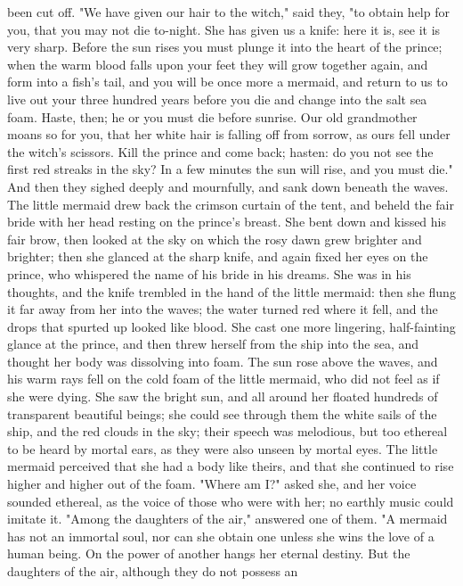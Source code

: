 been cut off.
    "We have given our hair to the witch," said they, "to obtain
help for you, that you may not die to-night. She has given us a knife:
here it is, see it is very sharp. Before the sun rises you must plunge
it into the heart of the prince; when the warm blood falls upon your
feet they will grow together again, and form into a fish's tail, and
you will be once more a mermaid, and return to us to live out your
three hundred years before you die and change into the salt sea
foam. Haste, then; he or you must die before sunrise. Our old
grandmother moans so for you, that her white hair is falling off
from sorrow, as ours fell under the witch's scissors. Kill the
prince and come back; hasten: do you not see the first red streaks
in the sky? In a few minutes the sun will rise, and you must die." And
then they sighed deeply and mournfully, and sank down beneath the
waves.
    The little mermaid drew back the crimson curtain of the tent,
and beheld the fair bride with her head resting on the prince's
breast. She bent down and kissed his fair brow, then looked at the sky
on which the rosy dawn grew brighter and brighter; then she glanced at
the sharp knife, and again fixed her eyes on the prince, who whispered
the name of his bride in his dreams. She was in his thoughts, and
the knife trembled in the hand of the little mermaid: then she flung
it far away from her into the waves; the water turned red where it
fell, and the drops that spurted up looked like blood. She cast one
more lingering, half-fainting glance at the prince, and then threw
herself from the ship into the sea, and thought her body was
dissolving into foam. The sun rose above the waves, and his warm
rays fell on the cold foam of the little mermaid, who did not feel
as if she were dying. She saw the bright sun, and all around her
floated hundreds of transparent beautiful beings; she could see
through them the white sails of the ship, and the red clouds in the
sky; their speech was melodious, but too ethereal to be heard by
mortal ears, as they were also unseen by mortal eyes. The little
mermaid perceived that she had a body like theirs, and that she
continued to rise higher and higher out of the foam. "Where am I?"
asked she, and her voice sounded ethereal, as the voice of those who
were with her; no earthly music could imitate it.
    "Among the daughters of the air," answered one of them. "A mermaid
has not an immortal soul, nor can she obtain one unless she wins the
love of a human being. On the power of another hangs her eternal
destiny. But the daughters of the air, although they do not possess an
